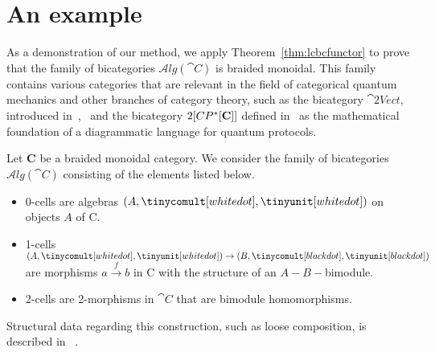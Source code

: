

\section{An example}\label{sec:Alg} 


As a demonstration of our method, we apply Theorem~\ref{thm:lcbcfunctor} to prove that the family of bicategories $\mathcal{A}lg({\cat C})$ is braided monoidal. This family contains various categories that are relevant in the field of categorical quantum mechanics and other branches of category theory, such as the bicategory $\cat{2Vect}$,  introduced in~\cite{kapranov562},~\cite{baez2004higher} and the bicategory $2[CP^*[{\bf C}]]$ defined in~\cite{heunenvicarywester} as the mathematical foundation of a diagrammatic language for quantum protocols.

Let {\bf C} be a braided monoidal category. We consider the family of bicategories $\mathcal{A}lg({\cat C})$ consisting of the elements listed below.
\begin{itemize}
\item 0-cells are algebras $(A, \tinycomult[white dot], \tinyunit[white dot])$ on objects $A$ of {\cat C}.
\item 1-cells $(A, \tinycomult[white dot], \tinyunit[white dot]) \rightarrow (B, \tinycomult[black dot], \tinyunit[black dot])$ are morphisms $a \xrightarrow{f} b$ in {\cat C} with the structure of an $A-B-$bimodule.
\item 2-cells are 2-morphisms in ${\cat C}$ that are bimodule homomorphisms.
\end{itemize}
Structural data regarding this construction, such as loose composition, is described in ~\cite{heunenvicarywester}.  %


